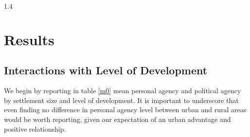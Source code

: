 \documentclass[10pt, letterpaper]{article}
\begin{document}
\begin{spacing}{1.4}

\section{Results}
\subsection{Interactions with Level of Development}

We begin by reporting in table \ref{m0} mean personal agency and political
agency by settlement size and level of development. It is important to
underscore that even finding no difference in personal agency level between
urban and rural areas would be worth reporting, given our expectation of an
urban advantage and positive relationship.


\end{spacing}
\end{document}
